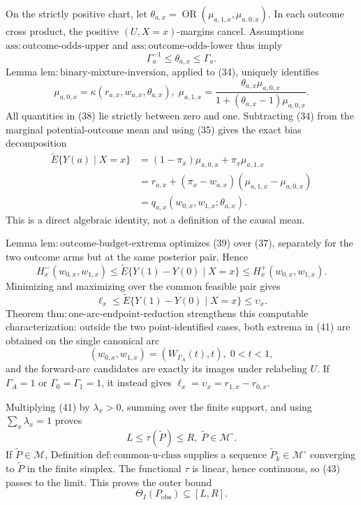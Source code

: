 On the strictly positive chart, let
\(\theta_{a,x}=\operatorname{OR}(\mu_{a,1,x},\mu_{a,0,x})\).  In each outcome cross product, the positive \((U,X=x)\)-margins cancel.  Assumptions \(\mathrm{ass{:}outcome\text{-}odds\text{-}upper}\) and \(\mathrm{ass{:}outcome\text{-}odds\text{-}lower}\) thus imply
\[
 \Gamma_a^{-1}\leq\theta_{a,x}\leq\Gamma_a.
 \tag{37}
\]
Lemma \(\mathrm{lem{:}binary\text{-}mixture\text{-}inversion}\), applied to (34), uniquely identifies
\[
 \mu_{a,0,x}=\kappa(r_{a,x},w_{a,x},\theta_{a,x}),
 \;
 \mu_{a,1,x}
 =\frac{\theta_{a,x}\mu_{a,0,x}}
        {1+(\theta_{a,x}-1)\mu_{a,0,x}}.
 \tag{38}
\]
All quantities in (38) lie strictly between zero and one.  Subtracting (34) from the marginal potential-outcome mean and using (35) gives the exact bias decomposition
\[
\begin{aligned}
 \widetilde E\{Y(a)\mid X=x\}
 &=(1-\pi_x)\mu_{a,0,x}+\pi_x\mu_{a,1,x}\\
 &=r_{a,x}+(\pi_x-w_{a,x})
      (\mu_{a,1,x}-\mu_{a,0,x})\\
 &=q_{a,x}(w_{0,x},w_{1,x};\theta_{a,x}).
\end{aligned}
\tag{39}
\]
This is a direct algebraic identity, not a definition of the causal mean.

Lemma \(\mathrm{lem{:}outcome\text{-}budget\text{-}extrema}\) optimizes (39) over (37), separately for the two outcome arms but at the same posterior pair.  Hence
\[
 H_x^-(w_{0,x},w_{1,x})
 \leq \widetilde E\{Y(1)-Y(0)\mid X=x\}
 \leq H_x^+(w_{0,x},w_{1,x}).
 \tag{40}
\]
Minimizing and maximizing over the common feasible pair gives
\[
 \ell_x\leq
 \widetilde E\{Y(1)-Y(0)\mid X=x\}
 \leq\upsilon_x.
 \tag{41}
\]
Theorem \(\mathrm{thm{:}one\text{-}arc\text{-}endpoint\text{-}reduction}\) strengthens this computable characterization: outside the two point-identified cases, both extrema in (41) are obtained on the single canonical arc
\[
 (w_{0,x},w_{1,x})=(W_{\Gamma_A}(t),t),\; 0<t<1,
 \tag{42}
\]
and the forward-arc candidates are exactly its images under relabeling \(U\).  If \(\Gamma_A=1\) or \(\Gamma_0=\Gamma_1=1\), it instead gives
\(\ell_x=\upsilon_x=r_{1,x}-r_{0,x}\).

Multiplying (41) by \(\lambda_x>0\), summing over the finite support, and using \(\sum_x\lambda_x=1\) proves
\[
 L\leq\tau(\widetilde P)\leq R,
 \; \widetilde P\in\mathcal M^{\circ}.
 \tag{43}
\]
If \(\widetilde P\in\mathcal M\), Definition \(\mathrm{def{:}common\text{-}u\text{-}class}\) supplies a sequence \(\widetilde P_k\in\mathcal M^{\circ}\) converging to \(\widetilde P\) in the finite simplex.  The functional \(\tau\) is linear, hence continuous, so (43) passes to the limit.  This proves the outer bound
\[
 \Theta_I(P_{\mathrm{obs}})\subseteq[L,R].
 \tag{44}
\]

